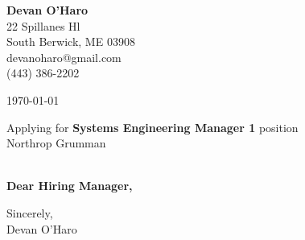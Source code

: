 \documentclass[12pt]{article}
\makeatletter
\newcommand{\yourname}{Devan O'Haro}
\newcommand{\youraddress}{22 Spillanes Hl}
\newcommand{\yourcitystatezip}{South Berwick, ME 03908}
\newcommand{\youremail}{devanoharo@gmail.com}
\newcommand{\yourphone}{(443) 386-2202}
\newcommand{\dateofletter}{\today}
\newcommand{\recipient}{Hiring Manager}
\newcommand{\companyname}{Northrop Grumman}
\newcommand{\companycitystatezip}{}
\newcommand{\job}{Systems Engineering Manager 1}
\makeatother
\begin{document}
\noindent
\begin{minipage}[t]{0.6\textwidth}
    \textbf{\yourname} \\
    \youraddress \\
    \yourcitystatezip \\
    \youremail \\
    \yourphone
\end{minipage}%
\hfill
\begin{minipage}[t]{0.35\textwidth}
    \raggedleft
    \dateofletter
\end{minipage}
\vspace{2em}

\noindent
Applying for \textbf{\job} position\\
\companyname \\
\companycitystatezip \\
\vspace{2em}

\noindent
\textbf{Dear \recipient,} \\
\vspace{1em}

\noindent
\vspace{1em}

\noindent
Sincerely, \\
\vspace{2em}
\yourname
\end{document}
